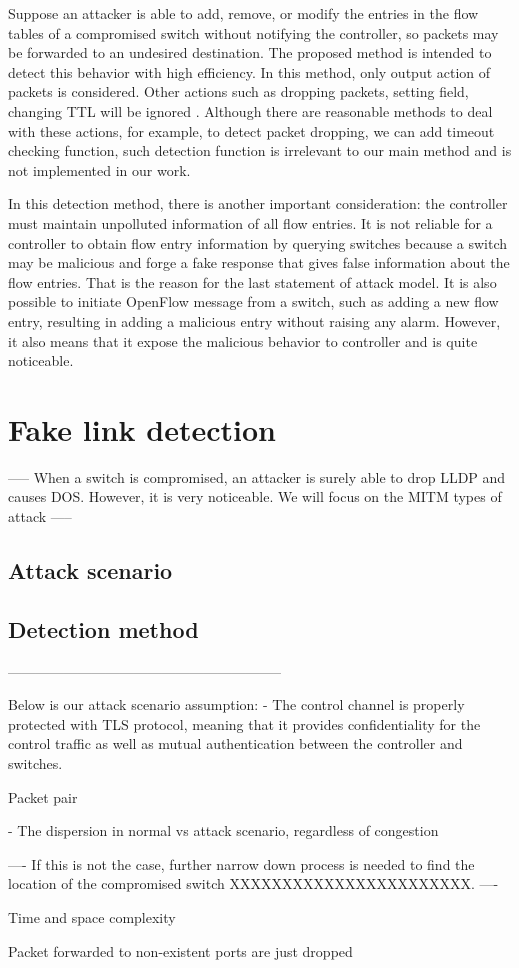Suppose an attacker is able to add, remove, or modify the entries in the flow tables of a compromised
switch without notifying the controller, so packets may be forwarded to an undesired destination. The proposed method is intended to detect this behavior with high efficiency. In this method, only output action of packets is considered. Other actions such as dropping packets, setting field, changing TTL will be ignored \sout{}. Although there are reasonable methods to deal with these actions, for example, to detect packet dropping, we can add timeout checking function, such detection function is irrelevant to our main method and is not implemented in our work.

In this detection method, there is another important consideration: the controller must maintain unpolluted information of all flow entries. It is not reliable for a controller to obtain flow entry information by querying switches because a switch may be malicious and forge a fake response that gives false information about the flow entries. That is the reason for the last statement of attack model. It is also possible to initiate OpenFlow message from a switch, such as adding a new flow entry, resulting in adding a malicious entry without raising any alarm. However, it also means that it expose the malicious behavior to controller and is quite noticeable.

\section{Fake link detection}

-----
When a switch is compromised, an attacker is surely able to drop LLDP and causes DOS. However, it is very noticeable. We will focus on the MITM types of attack
-----
\subsection{Attack scenario}
\subsection{Detection method}


-----------------------------------------------------------

Below is our attack scenario assumption: 
- The control channel is properly protected with TLS protocol, meaning
that it provides confidentiality for the control traffic as well as mutual
authentication between the controller and switches.

Packet pair

- The dispersion in normal vs attack scenario, regardless of congestion

----
If this is not the case, further narrow down process is needed to find the location of the compromised switch XXXXXXXXXXXXXXXXXXXXXXX.
----

Time and space complexity


Packet forwarded to non-existent ports are just dropped
